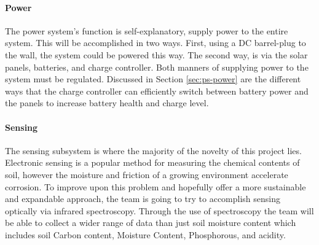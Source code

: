 \paragraph{Power}
The power system's function is self-explanatory, supply power to the entire system. This will be accomplished in two ways. First, using a DC barrel-plug to the wall, the system could be powered this way. The second way, is via the solar panels, batteries, and charge controller. Both manners of supplying power to the system must be regulated. Discussed in Section \ref{sec:ps-power} are the different ways that the charge controller can efficiently switch between battery power and the panels to increase battery health and charge level.
\paragraph{Sensing}
The sensing subsystem is where the majority of the novelty of this project lies. Electronic sensing is a popular method for measuring the chemical contents of soil, however the moisture and friction of a growing environment accelerate corrosion. To improve upon this problem and hopefully offer a more sustainable and expandable approach, the team is going to try to accomplish sensing optically via infrared spectroscopy. Through the use of spectroscopy the team will be able to collect a wider range of data than just soil moisture content which includes soil Carbon content, Moisture Content, Phosphorous, and acidity.
